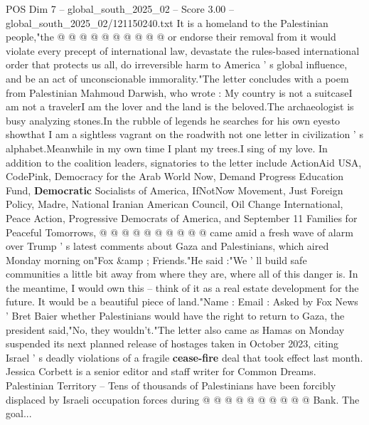 \begin{textsample}{POS Dim 7 – global\_south\_2025\_02 – Score 3.00 – global\_south\_2025\_02/121150240.txt}
It is a homeland to the Palestinian people,"the @ @ @ @ @ @ @ @ @ @ or endorse their removal from it would violate every precept of international law, devastate the rules-based international order that protects us all, do irreversible harm to America ' s global influence, and be an act of unconscionable immorality."The letter concludes with a poem from Palestinian Mahmoud Darwish, who wrote : My country is not a suitcaseI am not a travelerI am the lover and the land is the beloved.The archaeologist is busy analyzing stones.In the rubble of legends he searches for his own eyesto showthat I am a sightless vagrant on the roadwith not one letter in civilization ' s alphabet.Meanwhile in my own time I plant my trees.I sing of my love.
In addition to the coalition leaders, signatories to the letter include ActionAid USA, CodePink, Democracy for the Arab World Now, Demand Progress Education Fund, \textbf{Democratic} Socialists of America, IfNotNow Movement, Just Foreign Policy, Madre, National Iranian American Council, Oil Change International, Peace Action, Progressive Democrats of America, and September 11 Families for Peaceful Tomorrows, @ @ @ @ @ @ @ @ @ @ came amid a fresh wave of alarm over Trump ' s latest comments about Gaza and Palestinians, which aired Monday morning on"Fox \&amp ; Friends."He said :"We ' ll build safe communities a little bit away from where they are, where all of this danger is.
In the meantime, I would own this -- think of it as a real estate development for the future.
It would be a beautiful piece of land."Name : Email : Asked by Fox News ' Bret Baier whether Palestinians would have the right to return to Gaza, the president said,"No, they wouldn't."The letter also came as Hamas on Monday suspended its next planned release of hostages taken in October 2023, citing Israel ' s deadly violations of a fragile \textbf{cease-fire} deal that took effect last month.
Jessica Corbett is a senior editor and staff writer for Common Dreams.
Palestinian Territory -- Tens of thousands of Palestinians have been forcibly displaced by Israeli occupation forces during @ @ @ @ @ @ @ @ @ @ Bank.
The goal...

\end{textsample}

